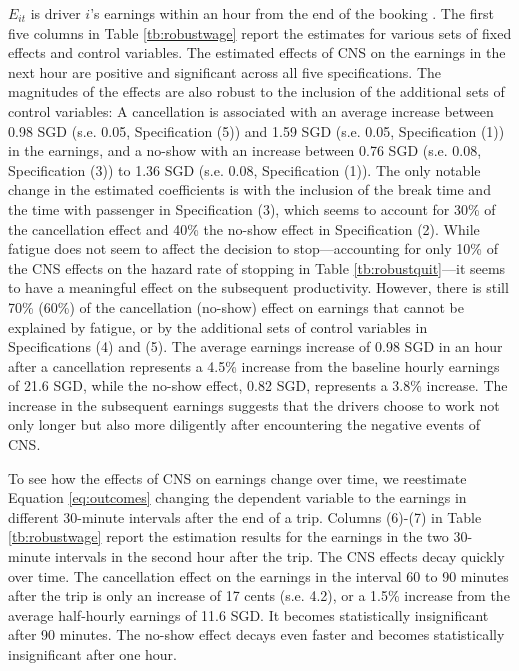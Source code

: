 \documentclass[reviewmode,AEJ]{AEA}
\begin{document}
$E_{it}$ is driver $i$'s earnings within an hour from the end of the booking%
. The first five columns in Table \ref{tb:robustwage} report the estimates for various sets of fixed effects and control variables. The estimated effects of CNS on the earnings in the next hour are positive and significant across all five specifications. The magnitudes of the effects are also robust to the inclusion of the additional sets of control variables: A cancellation is associated with an average increase between 0.98 SGD (s.e. 0.05, Specification (5)) and 1.59 SGD (s.e. 0.05, Specification (1)) in the earnings, and a no-show with an increase between 0.76 SGD (s.e. 0.08, Specification (3)) to 1.36 SGD (s.e. 0.08, Specification (1)). The only notable change in the estimated coefficients is with the inclusion of the break time and the time with passenger in Specification (3), which seems to account for 30\% of the cancellation effect and 40\% the no-show effect in Specification (2). While fatigue does not seem to affect the decision to stop---accounting for only 10\% of the CNS effects on the hazard rate of stopping in Table \ref{tb:robustquit}---it seems to have a meaningful effect on the subsequent productivity. However, there is still 70\% (60\%) of the cancellation (no-show) effect %
on earnings that cannot be explained by fatigue, or by the additional sets of control variables in Specifications (4) and (5). The average earnings increase of 0.98 SGD in an hour after a cancellation %
represents a 4.5\% increase from the baseline hourly earnings of 21.6 SGD, while the no-show effect, 0.82 SGD, represents a 3.8\% increase. The increase in the subsequent earnings suggests that the drivers choose to work not only  longer but also more diligently after encountering the negative events of CNS.


To see how the effects of CNS on earnings change over time, we reestimate Equation \eqref{eq:outcomes} changing the dependent variable to the earnings in different 30-minute intervals after the end of a trip. Columns (6)-(7) in Table \ref{tb:robustwage} report the estimation results for the earnings in the two 30-minute intervals in the second hour after the trip. The CNS effects decay quickly over time. The cancellation effect on the earnings in the interval 60 to 90 minutes after the trip is only an increase of 17 cents (s.e. 4.2), or a 1.5\% increase from the average half-hourly earnings of 11.6 SGD. It becomes statistically insignificant after 90 minutes. The no-show effect decays even faster and becomes statistically insignificant after one hour.
\end{document}
